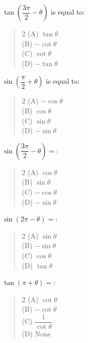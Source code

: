 \documentclass[11pt,a4paper]{article}
\begin{document}
\begin{mcqlist}
\item $\tan\left(\dfrac{3\pi}{2}-\theta\right)$ is equal to:
\begin{quote}\begin{multicols}{2}
\noindent (A) $\tan\theta$ \\
(B) $-\cot\theta$ \\
(C) $\cot\theta$ \\
(D) $-\tan\theta$
\end{multicols}\end{quote}

\item $\sin\left(\dfrac{\pi}{2}+\theta\right)$ is equal to:
\begin{quote}\begin{multicols}{2}
\noindent (A) $-\cos\theta$ \\
(B) $\cos\theta$ \\
(C) $\sin\theta$ \\
(D) $-\sin\theta$
\end{multicols}\end{quote}

\item $\sin\left(\dfrac{3\pi}{2}-\theta\right) = $:
\begin{quote}\begin{multicols}{2}
\noindent (A) $\cos\theta$ \\
(B) $\sin\theta$ \\
(C) $-\cos\theta$ \\
(D) $-\sin\theta$
\end{multicols}\end{quote}

\item $\sin(2\pi-\theta) = $:
\begin{quote}\begin{multicols}{2}
\noindent (A) $\sin\theta$ \\
(B) $-\sin\theta$ \\
(C) $\cos\theta$ \\
(D) $\tan\theta$
\end{multicols}\end{quote}

\item $\tan(\pi+\theta) = $:
\begin{quote}\begin{multicols}{2}
\noindent (A) $\cot\theta$ \\
(B) $-\cot\theta$ \\
(C) $\dfrac{1}{\cot\theta}$ \\
(D) None
\end{multicols}\end{quote}


\end{mcqlist}
\end{document}
